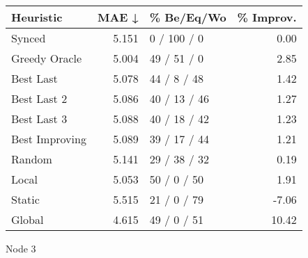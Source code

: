 \begin{tabular}{lrlr}
\toprule
\textbf{Heuristic} & \textbf{MAE ↓} & \textbf{\% Be/Eq/Wo} & \textbf{\% Improv.} \\
\midrule
            Synced &          5.151 &          0 / 100 / 0 &                0.00 \\
     Greedy Oracle &          5.004 &          49 / 51 / 0 &                2.85 \\
         Best Last &          5.078 &          44 / 8 / 48 &                1.42 \\
       Best Last 2 &          5.086 &         40 / 13 / 46 &                1.27 \\
       Best Last 3 &          5.088 &         40 / 18 / 42 &                1.23 \\
    Best Improving &          5.089 &         39 / 17 / 44 &                1.21 \\
            Random &          5.141 &         29 / 38 / 32 &                0.19 \\
             Local &          5.053 &          50 / 0 / 50 &                1.91 \\
            Static &          5.515 &          21 / 0 / 79 &               -7.06 \\
            Global &          4.615 &          49 / 0 / 51 &               10.42 \\
\bottomrule
\end{tabular}
\caption{Node 3}
\label{tab:ds_iid_lr05_le1_bs2_3}

